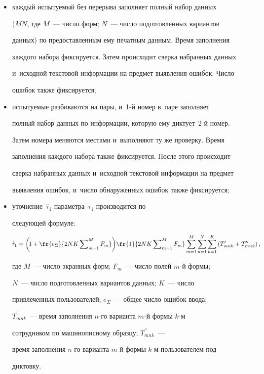       \begin{itemize}


\item каждый испытуемый без перерыва заполняет полный набор данных 


($M N$, где $M$~--- число форм; $N$~--- число подготовленных вариантов 


данных) по предоставленным ему печатным данным. Время заполнения 


каждого набора фиксируется. Затем происходит сверка набранных данных 


и~исходной текстовой информации на предмет выявления ошибок. Число 


ошибок также фиксируется;


\item испытуемые разбиваются на пары, и~1-й номер в~паре заполняет 


полный набор данных по информации, которую ему диктует~2-й номер. 


Затем номера меняются местами и~выполняют ту же проверку. Время 


заполнения каждого набора также фиксируется. После этого происходит 


сверка набранных данных и~исходной текстовой информации на предмет 


выявления ошибок, и~число обнаруженных ошибок также фиксируется;


\item уточнение~$\hat{\tau}_1$ параметра~$\tau_1$ производится по 


следующей формуле:


\begin{equation*}


\!\hat{\tau}_1=\left(\! 1+\fr{e_\Sigma}{2NK\sum\nolimits_{m=1}^M F_m}\right)\!


\fr{1}{2NK\sum\nolimits_{m=1}^M F_m} \sum\limits^M_{m=1} 


\sum\limits^N_{n=1} \sum\limits^K_{k=1} \left( 


T^\prime_{mnk}+T_{mnk}^{\prime\prime}\right),




\end{equation*}


где $M$~--- число экранных форм; $F_m$~--- число полей $m$-й формы; 


$N$~--- число подготовленных вариантов данных; $K$~--- число 


привлеченных пользователей; $e_\Sigma$~--- общее число ошибок ввода; 


$T^\prime_{mnk}$~--- время заполнения $n$-го варианта $m$-й формы $k$-м 


сотрудником по машинописному образцу; $T^{\prime\prime}_{mnk}$~--- 


время заполнения $n$-го варианта $m$-й формы $k$-м пользователем под 


диктовку.


\end{itemize}


